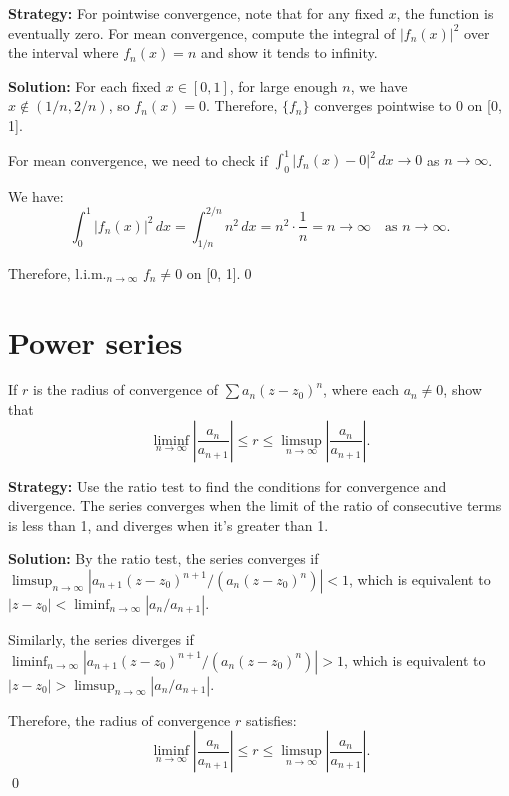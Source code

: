 \noindent\textbf{Strategy:} For pointwise convergence, note that for any fixed \( x \), the function is eventually zero. For mean convergence, compute the integral of \( |f_n(x)|^2 \) over the interval where \( f_n(x) = n \) and show it tends to infinity.

\bigskip\noindent\textbf{Solution:} For each fixed \( x \in [0, 1] \), for large enough \( n \), we have \( x \notin (1/n, 2/n) \), so \( f_n(x) = 0 \). Therefore, \( \{f_n\} \) converges pointwise to 0 on [0, 1].

For mean convergence, we need to check if \( \int_0^1 |f_n(x) - 0|^2 \, dx \to 0 \) as \( n \to \infty \).

We have:
\[\int_0^1 |f_n(x)|^2 \, dx = \int_{1/n}^{2/n} n^2 \, dx = n^2 \cdot \frac{1}{n} = n \to \infty \quad \text{as } n \to \infty.\]

Therefore, l.i.m.\(_{n\to\infty}\) \( f_n \neq 0 \) on [0, 1].\qed
\section{Power series}



\begin{problembox}
\begin{problemstatement}
If \( r \) is the radius of convergence of \( \sum a_n(z - z_0)^n \), where each \( a_n \neq 0 \), show that
\[ \liminf_{n\to\infty} \left| \frac{a_n}{a_{n+1}} \right| \leq r \leq \limsup_{n\to\infty} \left| \frac{a_n}{a_{n+1}} \right|.\]
\end{problemstatement}
\end{problembox}

\noindent\textbf{Strategy:} Use the ratio test to find the conditions for convergence and divergence. The series converges when the limit of the ratio of consecutive terms is less than 1, and diverges when it's greater than 1.

\bigskip\noindent\textbf{Solution:} By the ratio test, the series converges if \( \limsup_{n\to\infty} |a_{n+1}(z - z_0)^{n+1} / (a_n(z - z_0)^n)| < 1 \), which is equivalent to \( |z - z_0| < \liminf_{n\to\infty} |a_n/a_{n+1}| \).

Similarly, the series diverges if \( \liminf_{n\to\infty} |a_{n+1}(z - z_0)^{n+1} / (a_n(z - z_0)^n)| > 1 \), which is equivalent to \( |z - z_0| > \limsup_{n\to\infty} |a_n/a_{n+1}| \).

Therefore, the radius of convergence \( r \) satisfies:
\[\liminf_{n\to\infty} \left| \frac{a_n}{a_{n+1}} \right| \leq r \leq \limsup_{n\to\infty} \left| \frac{a_n}{a_{n+1}} \right|.\]\qed


